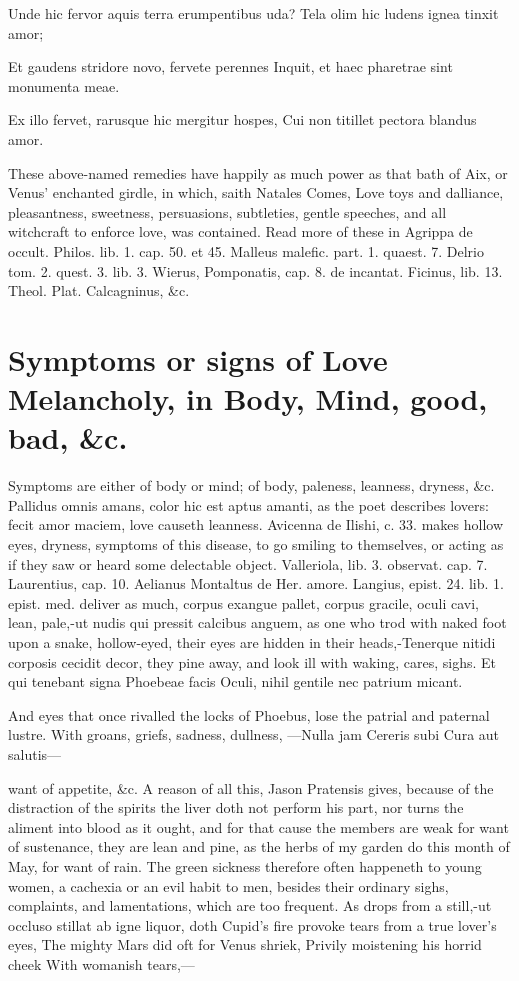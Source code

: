 {Unde hic fervor aquis terra erumpentibus uda?
Tela olim hic ludens ignea tinxit amor;

Et gaudens stridore novo, fervete perennes
Inquit, et haec pharetrae sint monumenta meae.

Ex illo fervet, rarusque hic mergitur hospes,
Cui non titillet pectora blandus amor.

These above-named remedies have happily as much power as that bath of
Aix, or Venus' enchanted girdle, in which, saith Natales Comes, Love
toys and dalliance, pleasantness, sweetness, persuasions, subtleties,
gentle speeches, and all witchcraft to enforce love, was contained.
Read more of these in Agrippa de occult. Philos. lib. 1. cap. 50. et
45. Malleus malefic. part. 1. quaest. 7. Delrio tom. 2. quest. 3. lib.
3. Wierus, Pomponatis, cap. 8. de incantat. Ficinus, lib. 13. Theol.
Plat. Calcagninus, \&c.


\section[Symptoms or signs of Love Melancholy]{Symptoms or signs of Love Melancholy, in Body, Mind, good, bad, \&c.}

Symptoms are either of body or mind; of body, paleness, leanness,
dryness, \&c. Pallidus omnis amans, color hic est aptus amanti, as
the poet describes lovers: fecit amor maciem, love causeth leanness.
 Avicenna de Ilishi, c. 33. makes hollow eyes, dryness, symptoms
of this disease, to go smiling to themselves, or acting as if they saw
or heard some delectable object. Valleriola, lib. 3. observat. cap. 7.
Laurentius, cap. 10. Aelianus Montaltus de Her. amore. Langius, epist.
24. lib. 1. epist. med. deliver as much, corpus exangue pallet, corpus
gracile, oculi cavi, lean, pale,-ut nudis qui pressit calcibus anguem,
as one who trod with naked foot upon a snake, hollow-eyed, their eyes
are hidden in their heads,-Tenerque nitidi corposis cecidit
decor, they pine away, and look ill with waking, cares, sighs.
Et qui tenebant signa Phoebeae facis
Oculi, nihil gentile nec patrium micant.

And eyes that once rivalled the locks of Phoebus, lose the patrial and
paternal lustre. With groans, griefs, sadness, dullness,
---Nulla jam Cereris subi
Cura aut salutis---

want of appetite, \&c. A reason of all this, Jason Pratensis
gives, because of the distraction of the spirits the liver doth not
perform his part, nor turns the aliment into blood as it ought, and for
that cause the members are weak for want of sustenance, they are lean
and pine, as the herbs of my garden do this month of May, for want of
rain. The green sickness therefore often happeneth to young women, a
cachexia or an evil habit to men, besides their ordinary sighs,
complaints, and lamentations, which are too frequent. As drops from a
still,-ut occluso stillat ab igne liquor, doth Cupid's fire provoke
tears from a true lover's eyes,
The mighty Mars did oft for Venus shriek,
Privily moistening his horrid cheek
With womanish tears,---

}
